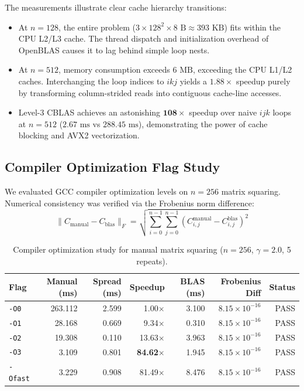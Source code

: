 \documentclass[11pt,a4paper]{article}
\begin{document}
The measurements illustrate clear cache hierarchy transitions:
\begin{itemize}
    \item At $n=128$, the entire problem ($3 \times 128^2 \times 8 \text{ B} \approx 393 \text{ KB}$) fits within the CPU L2/L3 cache. The thread dispatch and initialization overhead of OpenBLAS causes it to lag behind simple loop nests.
    \item At $n=512$, memory consumption exceeds $6 \text{ MB}$, exceeding the CPU L1/L2 caches. Interchanging the loop indices to $ikj$ yields a $\mathbf{1.88\times}$ speedup purely by transforming column-strided reads into contiguous cache-line accesses.
    \item Level-3 CBLAS achieves an astonishing $\mathbf{108\times}$ speedup over naive $ijk$ loops at $n=512$ ($2.67 \text{ ms}$ vs $288.45 \text{ ms}$), demonstrating the power of cache blocking and AVX2 vectorization.
\end{itemize}

\subsection{Compiler Optimization Flag Study}
We evaluated GCC compiler optimization levels on $n=256$ matrix squaring. Numerical consistency was verified via the Frobenius norm difference:
\begin{equation}
\|C_{\text{manual}} - C_{\text{blas}}\|_F = \sqrt{\sum_{i=0}^{n-1} \sum_{j=0}^{n-1} (C_{i,j}^{\text{manual}} - C_{i,j}^{\text{blas}})^2}
\end{equation}

\begin{table}[htbp]
\centering
\small
\caption{Compiler optimization study for manual matrix squaring ($n=256$, $\gamma=2.0$, 5 repeats).}
\label{tab:compiler_flags}
\begin{tabular}{@{}lrrrrrr@{}}
\toprule
Flag & Manual (ms) & Spread (ms) & Speedup & BLAS (ms) & Frobenius Diff & Status \\
\midrule
\texttt{-O0}   & 263.112 & 2.599 & 1.00$\times$  & 3.100 & $8.15 \times 10^{-16}$ & PASS \\
\texttt{-O1}   & 28.168  & 0.669 & 9.34$\times$  & 0.310 & $8.15 \times 10^{-16}$ & PASS \\
\texttt{-O2}   & 19.308  & 0.110 & 13.63$\times$ & 3.963 & $8.15 \times 10^{-16}$ & PASS \\
\texttt{-O3}   & 3.109   & 0.801 & \textbf{84.62$\times$} & 1.945 & $8.15 \times 10^{-16}$ & PASS \\
\texttt{-Ofast} & 3.229  & 0.908 & 81.49$\times$ & 8.476 & $8.15 \times 10^{-16}$ & PASS \\
\bottomrule
\end{tabular}
\end{table}
\end{document}
